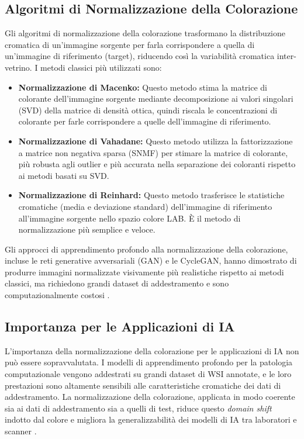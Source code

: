 \subsection{Algoritmi di Normalizzazione della Colorazione}

Gli algoritmi di normalizzazione della colorazione trasformano la distribuzione cromatica di
un'immagine sorgente per farla corrispondere a quella di un'immagine di riferimento (target),
riducendo così la variabilità cromatica inter-vetrino. I metodi classici più utilizzati sono:

\begin{itemize}
    \item \textbf{Normalizzazione di Macenko:} Questo metodo stima la matrice di colorante
    dell'immagine sorgente mediante decomposizione ai valori singolari (SVD) della matrice di
    densità ottica, quindi riscala le concentrazioni di colorante per farle corrispondere a quelle
    dell'immagine di riferimento.

    \item \textbf{Normalizzazione di Vahadane:} Questo metodo utilizza la fattorizzazione a
    matrice non negativa sparsa (SNMF) per stimare la matrice di colorante, più robusta agli
    outlier e più accurata nella separazione dei coloranti rispetto ai metodi basati su SVD.

    \item \textbf{Normalizzazione di Reinhard:} Questo metodo trasferisce le statistiche
    cromatiche (media e deviazione standard) dell'immagine di riferimento all'immagine sorgente
    nello spazio colore LAB. È il metodo di normalizzazione più semplice e veloce.
\end{itemize}

Gli approcci di apprendimento profondo alla normalizzazione della colorazione, incluse le reti
generative avversariali (GAN) e le CycleGAN, hanno dimostrato di produrre immagini normalizzate
visivamente più realistiche rispetto ai metodi classici, ma richiedono grandi dataset di
addestramento e sono computazionalmente costosi \cite{tellez2019}.

\subsection{Importanza per le Applicazioni di IA}

L'importanza della normalizzazione della colorazione per le applicazioni di IA non può essere
sopravvalutata. I modelli di apprendimento profondo per la patologia computazionale vengono
addestrati su grandi dataset di WSI annotate, e le loro prestazioni sono altamente sensibili alle
caratteristiche cromatiche dei dati di addestramento. La normalizzazione della colorazione,
applicata in modo coerente sia ai dati di addestramento sia a quelli di test, riduce questo
\emph{domain shift} indotto dal colore e migliora la generalizzabilità dei modelli di IA tra
laboratori e scanner \cite{tellez2019}.

